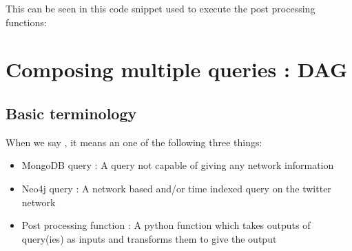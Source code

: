 \documentclass[letterpaper,10pt,english]{sphinxmanual}
\begin{document}
This can be seen in this code snippet used to execute the post processing functions:

%
\begin{sphinxVerbatim}[commandchars=\\\{\}]
  
         
       
        \PYG{p}{[}\PYG{p}{]}  \PYG{p}{[}\PYG{p}{]}
   
\end{sphinxVerbatim}


\chapter{Composing multiple queries : DAG}
\label{\detokenize{dag:composing-multiple-queries-dag}}\label{\detokenize{dag::doc}}

\section{Basic terminology}
\label{\detokenize{dag:basic-terminology}}
When we say , it means an one of the following three things:
\begin{itemize}
\item {} 
MongoDB query : A query not capable of giving any network information

\item {} 
Neo4j query : A network based and/or time indexed query on the twitter network

\item {} 
Post processing function : A python function which takes outputs of query(ies) as inputs and transforms them to give the output

\end{itemize}
\end{document}
